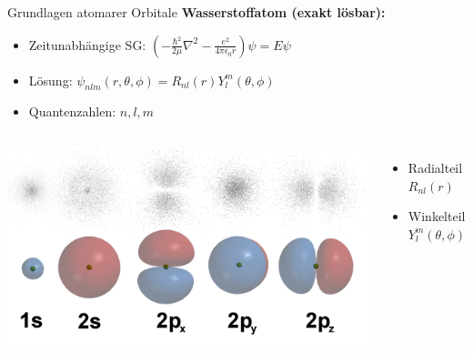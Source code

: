 \begin{frame}{Grundlagen atomarer Orbitale}
    \textbf{Wasserstoffatom (exakt lösbar):}
    \begin{itemize}
        \item Zeitunabhängige SG: $\left(-\frac{\hbar^2}{2\mu}\nabla^2 - \frac{e^2}{4\pi\epsilon_0 r}\right)\psi = E\psi$
        \item Lösung: $\psi_{nlm}(r,\theta,\phi) = R_{nl}(r)Y_l^m(\theta,\phi)$
        \item Quantenzahlen: $n,l,m$
    \end{itemize}

    \begin{columns}
        \includegraphics[width=\textwidth]{orbitals.png}

        \begin{itemize}
            \item Radialteil $R_{nl}(r)$
            \item Winkelteil $Y_l^m(\theta,\phi)$
        \end{itemize}
    \end{columns}
\end{frame}
%
%
